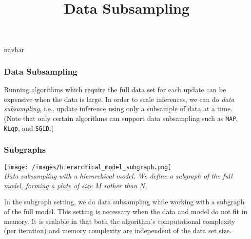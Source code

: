 \title{Data Subsampling}

{{navbar}}

\subsubsection{Data Subsampling}

Running algorithms which require the full data set for each update
can be expensive when the data is large. In order to scale inferences,
we can do \emph{data subsampling}, i.e., update inference using
only a subsample of data at a time.
(Note that only certain algorithms can support data subsampling such as
\texttt{MAP}, \texttt{KLqp}, and \texttt{SGLD}.)

\subsubsection{Subgraphs}

\texttt{[image: /images/hierarchical\_model\_subgraph.png]} \\
{\small\textit{Data subsampling with a hierarchical model. We define
a subgraph of the full model, forming a plate of size $M$ rather than
$N$.}}

In the subgraph setting, we do data subsampling while working with a
subgraph of the full model. This setting is necessary when the data
and model do not fit in memory.
It is scalable in that both the
algorithm's computational complexity (per iteration) and memory
complexity are independent of the data set size.

